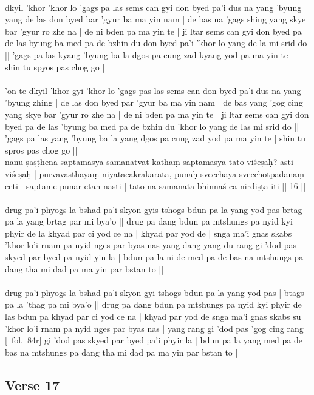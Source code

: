 \documentclass[12pt]{article}
\begin{document}
\textbf{\TVA}\\
dkyil 'khor 'khor lo 'gags pa las sems can gyi don byed pa'i dus na yang 'byung yang de las don byed bar 'gyur ba ma yin nam | de bas na 'gags shing yang skye bar 'gyur ro zhe na | de ni bden pa ma yin te | ji ltar sems can gyi don byed pa de las byung ba med pa de bzhin du don byed pa'i 'khor lo yang de la mi srid do || 'gags pa las kyang 'byung ba la dgos pa cung zad kyang yod pa ma yin te | shin tu spyos pas chog go || \\

\textbf{\TVB}\\
'on te dkyil 'khor gyi 'khor lo 'gags pas las sems can don byed pa'i dus na yang 'byung zhing | de las don byed par 'gyur ba ma yin nam | de bas yang 'gog cing yang skye bar 'gyur ro zhe na | de ni bden pa ma yin te | ji ltar sems can gyi don byed pa de las 'byung ba med pa de bzhin du 'khor lo yang de las mi srid do || 'gags pa las yang 'byung ba la yang dgos pa cung zad yod pa ma yin te | shin tu spros pas chog go || \\

nanu ṣaṣṭhena saptamasya samānatvāt kathaṃ saptamasya tato viśeṣaḥ? asti viśeṣaḥ | pūrvāvasthāyāṃ niyatacakrākāratā, punaḥ svecchayā svecchotpādanaṃ ceti | saptame punar etan nāsti | tato na samānatā bhinnaś ca nirdiṣṭa iti || 16 ||\\

\textbf{\TVA}\\
drug pa'i phyogs la bshad pa'i skyon gyis tshogs bdun pa la yang yod pas brtag pa la yang brtag par mi bya'o || drug pa dang bdun pa mtshungs pa nyid kyi phyir de la khyad par ci yod ce na | khyad par yod de | snga ma'i gnas skabs 'khor lo'i rnam pa nyid nges par byas nas yang dang yang du rang gi 'dod pas skyed par byed pa nyid yin la | bdun pa la ni de med pa de bas na mtshungs pa dang tha mi dad pa ma yin par bstan to || \\

\textbf{\TVB}\\
drug pa'i phyogs la bshad pa'i skyon gyi tshogs bdun pa la yang yod pas | btags pa la 'thag pa mi bya'o || drug pa dang bdun pa mtshungs pa nyid kyi phyir de las bdun pa khyad par ci yod ce na | khyad par yod de snga ma'i gnas skabs su 'khor lo'i rnam pa nyid nges par byas nas | yang rang gi 'dod pas 'gog cing rang [\TVB\ fol.\ 84r] gi 'dod pas skyed par byed pa'i phyir la | bdun pa la yang med pa de bas na mtshungs pa dang tha mi dad pa ma yin par bstan to || 

\subsection{Verse 17}
\end{document}
